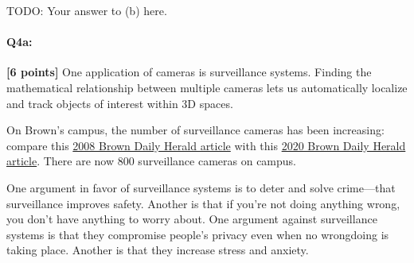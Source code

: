 \begin{enumerate}[(a)]
\begin{enumerate} [(a)]
\begin{tcolorbox}[colback=white!5!white,colframe=green!75!black]
{{    TODO: Your answer to (b) here.

    }}
\end{tcolorbox}

\end{enumerate}

\end{enumerate}







\pagebreak 
\paragraph{Q4a:} \textbf{[6 points]} One application of cameras is surveillance systems. Finding the mathematical relationship between multiple cameras lets us automatically localize and track objects of interest within 3D spaces.

On Brown's campus, the number of surveillance cameras has been increasing: compare this \href{https://www.browndailyherald.com/2008/01/10/surveillance-cameras-on-campus-triple/}{2008 Brown Daily Herald article} with this \href{https://www.browndailyherald.com/2020/02/21/cameras-installed-hegeman-hall/}{2020 Brown Daily Herald article}. There are now 800 surveillance cameras on campus.

One argument in favor of surveillance systems is to deter and solve crime---that surveillance improves safety. Another is that if you're not doing anything wrong, you don't have anything to worry about. One argument against surveillance systems is that they compromise people's privacy even when no wrongdoing is taking place. Another is that they increase stress and anxiety.

